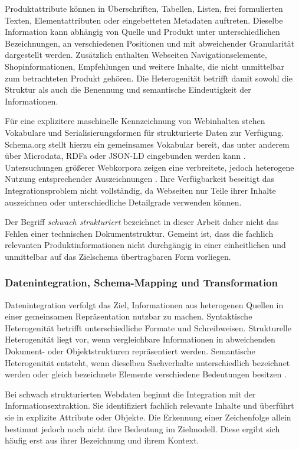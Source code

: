 Produktattribute können in Überschriften, Tabellen, Listen, frei formulierten Texten, Elementattributen oder eingebetteten Metadaten auftreten. Dieselbe Information 
kann abhängig von Quelle und Produkt unter unterschiedlichen Bezeichnungen, an verschiedenen Positionen und mit abweichender Granularität dargestellt werden. 
Zusätzlich enthalten Webseiten Navigationselemente, Shopinformationen, Empfehlungen und weitere Inhalte, die nicht unmittelbar zum betrachteten Produkt gehören. 
Die Heterogenität betrifft damit sowohl die Struktur als auch die Benennung und semantische Eindeutigkeit der Informationen.

Für eine explizitere maschinelle Kennzeichnung von Webinhalten stehen Vokabulare und Serialisierungsformen für strukturierte Daten zur Verfügung. Schema.org 
stellt hierzu ein gemeinsames Vokabular bereit, das unter anderem über Microdata, RDFa oder JSON-LD eingebunden werden kann \cite{guha2016schema}. Untersuchungen 
größerer Webkorpora zeigen eine verbreitete, jedoch heterogene Nutzung entsprechender Auszeichnungen \cite{meusel2015web}. Ihre Verfügbarkeit beseitigt das 
Integrationsproblem nicht vollständig, da Webseiten nur Teile ihrer Inhalte auszeichnen oder unterschiedliche Detailgrade verwenden können.

Der Begriff \emph{schwach strukturiert} bezeichnet in dieser Arbeit daher nicht das Fehlen einer technischen Dokumentstruktur. Gemeint ist, dass die fachlich 
relevanten Produktinformationen nicht durchgängig in einer einheitlichen und unmittelbar auf das Zielschema übertragbaren Form vorliegen.

\subsubsection{Datenintegration, Schema-Mapping und Transformation}

Datenintegration verfolgt das Ziel, Informationen aus heterogenen Quellen in einer gemeinsamen Repräsentation nutzbar zu machen. Syntaktische Heterogenität 
betrifft unterschiedliche Formate und Schreibweisen. Strukturelle Heterogenität liegt vor, wenn vergleichbare Informationen in abweichenden Dokument- oder 
Objektstrukturen repräsentiert werden. Semantische Heterogenität entsteht, wenn dieselben Sachverhalte unterschiedlich bezeichnet werden oder gleich bezeichnete 
Elemente verschiedene Bedeutungen besitzen \cite{doan2012principles}.

Bei schwach strukturierten Webdaten beginnt die Integration mit der Informationsextraktion. Sie identifiziert fachlich relevante Inhalte und überführt sie in 
explizite Attribute oder Objekte. Die Erkennung einer Zeichenfolge allein bestimmt jedoch noch nicht ihre Bedeutung im Zielmodell. Diese ergibt sich häufig 
erst aus ihrer Bezeichnung und ihrem Kontext.


